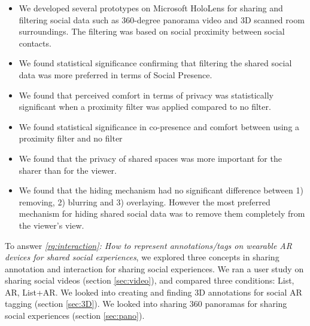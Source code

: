 \begin{itemize}
    \item{We developed several prototypes on Microsoft HoloLens for sharing and filtering social data such as 360-degree panorama video and 3D scanned room surroundings. The filtering was based on social proximity between social contacts.}
    \item{We found statistical significance confirming that filtering the shared social data was more preferred in terms of Social Presence.}
    \item{We found that perceived comfort in terms of privacy was statistically significant when a proximity filter was applied compared to no filter.}
    \item{We found statistical significance in co-presence and comfort between using a proximity filter and no filter}
    \item{We found that the privacy of shared spaces was more important for the sharer than for the viewer.}
    \item{We found that the hiding mechanism had no significant difference between 1) removing, 2) blurring and 3) overlaying. However the most preferred mechanism for hiding shared social data was to remove them completely from the viewer's view.}
\end{itemize}

To answer \textit{\ref{rq:interaction}: How to represent annotations/tags on wearable AR devices for shared social experiences}, we explored three concepts in sharing annotation and interaction for sharing social experiences. We ran a user study on sharing social videos (section \ref{sec:video}), and compared three conditions: List, AR, List+AR. We looked into creating and finding 3D annotations for social AR tagging (section \ref{sec:3D}). We looked into sharing 360 panoramas for sharing social experiences (section \ref{sec:pano}). 


